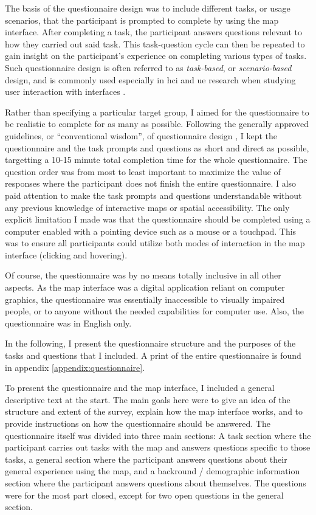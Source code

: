 The basis of the questionnaire design was to include
different tasks, or usage scenarios,
that the participant is prompted to complete by using the map interface.
After completing a task,
the participant answers questions relevant to how they carried out said task.
This task-question cycle can then be repeated to gain insight on the participant's
experience on completing various types of tasks.
Such questionnaire design is often referred to as \textit{task-based},
or \textit{scenario-based} design,
and is commonly used especially in \acrshort{hci} and \acrshort{ue} research
when studying user interaction with interfaces \parencite{ada2008, lew1991}.

Rather than specifying a particular target group,
I aimed for the questionnaire to be realistic to complete for as many as possible.
Following the generally approved guidelines,
or \enquote{conventional wisdom}, of questionnaire design \parencite{kro2018},
I kept the questionnaire and the task prompts and questions as short and direct as possible,
targetting a 10-15 minute total completion time for the whole questionnaire.
The question order was from most to least important to maximize
the value of responses where the participant does not finish the entire questionnaire.
I also paid attention to make the task prompts and questions
understandable without any previous knowledge of interactive maps or spatial accessibility.
The only explicit limitation I made was that the questionnaire should be completed
using a computer enabled with a pointing device such as a mouse or a touchpad.
This was to ensure all participants could utilize both modes of interaction in the map interface
(clicking and hovering).

Of course, the questionnaire was by no means totally inclusive in all other aspects.
As the map interface was a digital application reliant on computer graphics,
the questionnaire was essentially inaccessible to visually impaired people,
or to anyone without the needed capabilities for computer use.
Also, the questionnaire was in English only.

In the following, I present the questionnaire structure
and the purposes of the tasks and questions that I included.
A print of the entire questionnaire is found in appendix \ref{appendix:questionnaire}.

To present the questionnaire and the map interface,
I included a general descriptive text at the start.
The main goals here were to give an idea of the structure and extent of the survey,
explain how the map interface works,
and to provide instructions on how the questionnaire should be answered.
The questionnaire itself was divided into three main sections:
A task section where the participant carries out tasks with the map
and answers questions specific to those tasks,
a general section where the participant answers questions about
their general experience using the map,
and a backround / demographic information section
where the participant answers questions about themselves.
The questions were for the most part closed,
except for two open questions in the general section.

